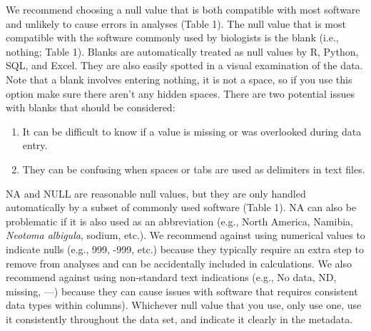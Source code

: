 We recommend choosing a null value that is both compatible with most
software and unlikely to cause errors in analyses (Table 1). The null
value that is most compatible with the software commonly used by
biologists is the blank (i.e., nothing; Table 1). Blanks are
automatically treated as null values by R, Python, SQL, and Excel. They
are also easily spotted in a visual examination of the data. Note that a
blank involves entering nothing, it is not a space, so if you use this
option make sure there aren't any hidden spaces. There are two potential
issues with blanks that should be considered:

\begin{enumerate}
\def\labelenumi{\arabic{enumi}.}
\itemsep1pt\parskip0pt
\item
  It can be difficult to know if a value is missing or was overlooked
  during data entry.
\item
  They can be confusing when spaces or tabs are used as delimiters in
  text files.
\end{enumerate}

NA and NULL are reasonable null values, but they are only handled
automatically by a subset of commonly used software (Table 1). NA can
also be problematic if it is also used as an abbreviation (e.g., North
America, Namibia, \emph{Neotoma albigula}, sodium, etc.). We recommend
against using numerical values to indicate nulls (e.g., 999, -999, etc.)
because they typically require an extra step to remove from analyses and
can be accidentally included in calculations. We also recommend against
using non-standard text indications (e.g., No data, ND, missing, ---)
because they can cause issues with software that requires consistent
data types within columns). Whichever null value that you use, only use
one, use it consistently throughout the data set, and indicate it
clearly in the metadata.

